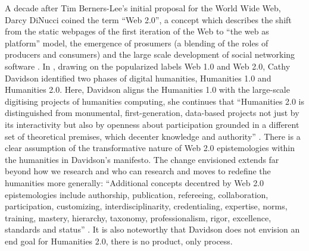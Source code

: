 \begin{paper}
A decade after Tim Berners-Lee’s initial proposal for the World Wide Web, Darcy DiNucci coined the term ``Web 2.0'', a concept which describes the shift from the static webpages of the first iteration of the Web to ``the web as platform'' model, the emergence of prosumers (a blending of the roles of producers and consumers) and the large scale development of social networking software \cite[32]{dinucci_fragmented_1999}. In \citeyear{davidson_humanities_2008}, drawing on the popularized labels Web 1.0 and Web 2.0, Cathy Davidson identified two phases of digital humanities, Humanities 1.0 and Humanities 2.0. Here, Davidson aligns the Humanities 1.0 with the large-scale digitising projects of humanities computing, she continues that ``Humanities 2.0 is distinguished from monumental, first-generation, data-based projects not just by its interactivity but also by openness about participation grounded in a different set of theoretical premises, which decenter knowledge and authority'' \citep[711--712]{davidson_humanities_2008}. There is a clear assumption of the transformative nature of Web 2.0 epistemologies within the humanities in Davidson’s manifesto. The change envisioned extends far beyond how we research and who can research and moves to redefine the humanities more generally: ``Additional concepts decentred by Web 2.0 epistemologies include authorship, publication, refereeing, collaboration, participation, customizing, interdisciplinarity, credentialing, expertise, norms, training, mastery, hierarchy, taxonomy, professionalism, rigor, excellence, standards and status'' \cite[712]{davidson_humanities_2008}. It is also noteworthy that Davidson does not envision an end goal for Humanities 2.0, there is no product, only process.


\end{paper}
